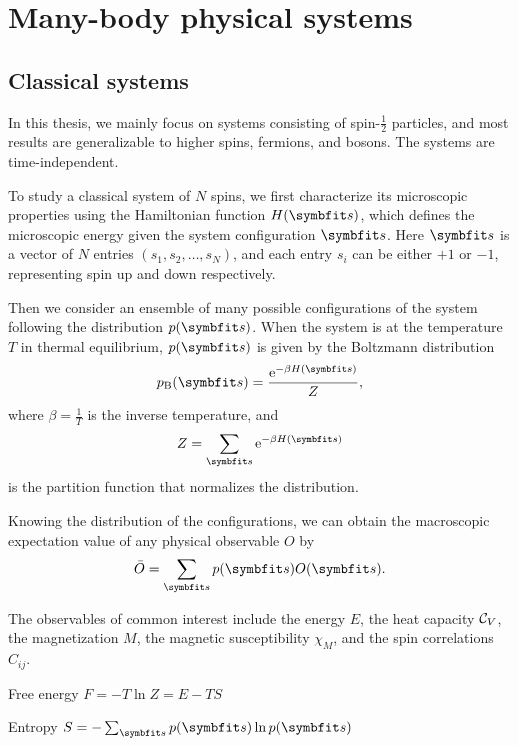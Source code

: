\chapter{Many-body physical systems}


\section{Classical systems}

In this thesis, we mainly focus on systems consisting of spin-$\frac{1}{2}$ particles, and most results are generalizable to higher spins, fermions, and bosons. The systems are time-independent.

To study a classical system of $N$ spins, we first characterize its microscopic properties using the Hamiltonian function $H(\vs)$, which defines the microscopic energy given the system configuration $\vs$. Here $\vs$ is a vector of $N$ entries $(s_1, s_2, \ldots, s_N)$, and each entry $s_i$ can be either $+1$ or $-1$, representing spin up and down respectively.

Then we consider an ensemble of many possible configurations of the system following the distribution $p(\vs)$. When the system is at the temperature $T$ in thermal equilibrium, $p(\vs)$ is given by the Boltzmann distribution
\begin{equation}
p_\text{B}(\vs) = \frac{\rme^{-\beta H(\vs)}}{Z},
\label{eq:boltzmann}
\end{equation}
where $\beta = \frac{1}{T}$ is the inverse temperature, and
\begin{equation}
Z = \sum_\vs \rme^{-\beta H(\vs)}
\end{equation}
is the partition function that normalizes the distribution.

Knowing the distribution of the configurations, we can obtain the macroscopic expectation value of any physical observable $O$ by
\begin{equation}
\bar{O} = \sum_\vs p(\vs) O(\vs).
\label{eq:cl-obs}
\end{equation}

The observables of common interest include the energy $E$, the heat capacity $\mathcal{C}_V$, the magnetization $M$, the magnetic susceptibility $\chi_M$, and the spin correlations $C_{i j}$.

Free energy $F = -T \ln Z = E - T S$

Entropy $S = -\sum_\vs p(\vs) \ln p(\vs)$


